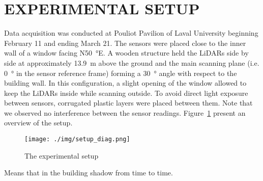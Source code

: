 \section{EXPERIMENTAL SETUP}
Data acquisition was conducted at Pouliot Pavilion of Laval University beginning February 11 and ending March 21. The sensors were placed close to the inner wall of a window facing N\SI{50}{\degree}E. A wooden structure held the LiDARs side by side at approximately \SI{13.9}{\meter} above the ground and the main scanning plane (i.e. \SI{0}{\degree} in the sensor reference frame) forming a \SI{30}{\degree} angle with respect to the building wall. In this configuration, a slight opening of the window allowed to keep the LiDARs inside while scanning outside. To avoid direct light exposure between sensors, corrugated plastic layers were placed between them. Note that we observed no interference between the sensor readings. Figure~\ref{fig:setup} present an overview of the setup.

\begin{figure}[h]
    \centering
    \texttt{[image: ./img/setup\_diag.png]}
    \caption{The experimental setup}
    \label{fig:setup}
\end{figure}

Means that in the building shadow from time to time.

